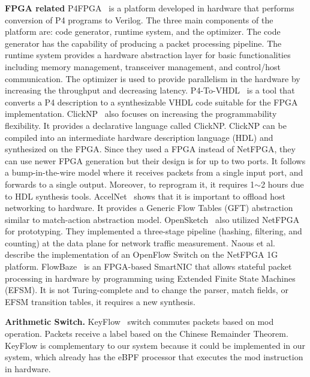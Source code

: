 \textbf{FPGA related} P4FPGA~\cite{p4fpga} is a platform developed in hardware that performs conversion of P4 programs to Verilog.
The three main components of the platform are: code generator, runtime system, and the optimizer. The code generator has the capability of producing a packet processing pipeline. The runtime system provides a hardware abstraction layer for basic functionalities including memory management, transceiver management, and control/host communication. The optimizer is used to provide parallelism in the hardware by increasing the throughput and decreasing latency.
P4-To-VHDL~\cite{BENACEK201822} is a tool that converts a P4 description to a synthesizable VHDL code suitable for the FPGA implementation.
ClickNP~\cite{ClickNP2016} also focuses on increasing the programmability flexibility.
It provides a declarative language called ClickNP.
ClickNP can be compiled into an intermediate hardware description language (HDL) and synthesized on the FPGA.
Since they used a FPGA instead of NetFPGA, they can use newer FPGA generation but their design is for up to two ports.
It follows a bump-in-the-wire model where it receives packets from a single input port, and forwards to a single output.
Moreover, to reprogram it, it requires 1$\sim$2 hours due to HDL synthesis tools.
AccelNet~\cite{AzureFPGA2018} shows that it is important to
offload host networking to hardware. It provides a Generic Flow Tables (GFT) abstraction similar to match-action abstraction model.
OpenSketch~\cite{Yu:2013:SDT:2482626.2482631} also utilized NetFPGA for prototyping. They implemented a three-stage pipeline (hashing, filtering, and counting) at the data plane for network traffic measurement. Naous et al.~\cite{Naous:2008:IOS:1477942.1477944} describe the implementation of an OpenFlow Switch on the NetFPGA 1G platform. 
FlowBaze~\cite{FlowBlaze2019} is an FPGA-based SmartNIC that allows stateful packet processing in hardware by programming using Extended Finite State Machines (EFSM). It is not Turing-complete and to change the parser, match fields, or EFSM transition tables, it requires a new synthesis.

\textbf{Arithmetic Switch.} KeyFlow~\cite{Martinello2014KeyFlow}
 switch commutes packets based on mod operation.
Packets receive a label based on the Chinese Remainder Theorem.
KeyFlow is complementary to our system because it could be implemented in our system, which already has the eBPF processor that executes the mod instruction in hardware. 

